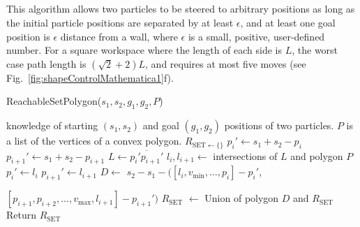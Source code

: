 \subsection{}
 This algorithm allows two particles to be steered to arbitrary positions as long as the initial particle positions are separated by at least $\epsilon$, and at least one goal position is $\epsilon$ distance from a wall, where $\epsilon$ is a small, positive, user-defined number. 
For a square workspace where the length of each side is $L$, the worst case path length is $(\sqrt{2}+2)L$, and requires at most five moves (see Fig.~\ref{fig:shapeControlMathematica1}f).



% 
 \begin{algorithm}[htb]
\caption{ { \sc ReachableSetPolygon}($s_1,s_2,g_1,g_2, P$)}\label{alg:polygonReachbale}
\begin{algorithmic}[1]
\Require knowledge of starting $(s_1,s_2)$ and goal $(g_1,g_2)$ positions of  two particles. 
$P$ is a list of the vertices of a convex polygon. %
\State $R_{\textrm{SET}\gets \{\}}$
\State $p_{i}' \gets s_1 + s_2 - p_i$
\State $p_{i+1}' \gets s_1 + s_2 - p_{i+1}$
\State $L \gets \overline{ p_i' p_{i+1}'}$ 
\State $l_i, l_{i+1} \gets $ intersections of $L$ and polygon $P$
\State $p_{i}' \gets l_i$
\EndIf
{}
\State $p_{i+1}' \gets l_{i+1}$
\EndIf
\State $D \gets$ $s_2 - s_1 -([l_i, v_{\textrm{min}}, ..., p_i ] -p_i' $,

$[p_{i+1} , p_{i+2}, ... , v_{\textrm{max}}, l_{i+1}] - p_{i+1}')$
\State $R_{\textrm{SET}}$ $\gets$ Union of polygon $D$ and $R_{\textrm{SET}}$
\EndFor
\State Return $R_{\textrm{SET}}$
\end{algorithmic}
\end{algorithm}



